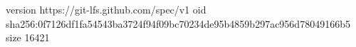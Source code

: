 version https://git-lfs.github.com/spec/v1
oid sha256:0f7126df1fa54543ba3724f94f09bc70234de95b4859b297ac956d78049166b5
size 16421
